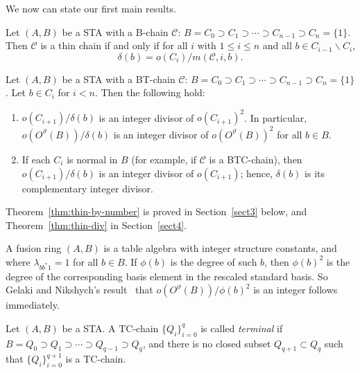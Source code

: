 \documentclass[ALCO,ThmDefs,Unicode,epreuves]{cedram}
\begin{document}
We now can state our first main results.

\begin{thm}
\label{thm:thin-by-number}
Let $(A, B)$ be a STA with a B-chain $\mathcal{C}$: $B = C_0 \supset C_1
\supset \cdots \supset C_{n-1} \supset C_n = \{1\}$. Then $\mathcal{C}$
is a thin chain if and only if for all $i$ with $1 \leq i \leq n$ and
all $b \in C_{i-1}\backslash C_i$,
\[
\delta(b) = o(C_i)/m(\mathcal{C}, i, b).
\]
\end{thm}

\begin{thm}
\label{thm:thin-div}
Let $(A, B)$ be a STA with a BT-chain $\mathcal{C}$: $B = C_0 \supset
C_1 \supset \cdots \supset C_{n-1} \supset C_n = \{1\}$. Let $b \in
C_i$ for $i < n$. Then the following hold:
\begin{enumerate}[label = (\roman*)] 
\item $o(C_{i+1})/\delta(b)$ is an integer divisor of
$o(C_{i+1})^2$. In particular,
$o(O^{\vartheta}(B))/\delta(b)$ is an integer divisor of
$o(O^{\vartheta}(B))^2$ for all $b \in B$. 
\item If each $C_i$ is normal in $B$ (for example, if $\mathcal{C}$ is a
BTC-chain), then $o(C_{i+1})/\delta(b)$ is an integer divisor of
$o(C_{i+1})$; hence, $\delta(b)$ is its complementary integer divisor.
\end{enumerate}
\end{thm} 

Theorem~\ref{thm:thin-by-number} is proved in Section~\ref{sect3}  below, and
Theorem~\ref{thm:thin-div} in Section~\ref{sect4}. 

\begin{rema}
\label{rem:fus}
A fusion ring $(A, B)$ is a table algebra with integer structure
constants, and where $\lambda_{bb^*1} = 1$ for all $b \in B$. If
$\phi(b)$ is the degree of such $b$, then $\phi(b)^2$ is the degree of
the corresponding basis element in the rescaled standard basis. So
Gelaki and Nikshych's result~\cite [Corollary~5.3]{GN} that
$o(O^{\vartheta}(B))/\phi(b)^2$ is an integer follows immediately.
\end{rema}

\begin{defi}
\label{def:terminal}
Let $(A, B)$ be a STA. A TC-chain $\{Q_i\}_{i=0}^q$ is called
\emph{terminal} if $B = Q_0 \supset Q_1 \supset \cdots \supset Q_{q-1}
\supset Q_q$, and there is no closed subset $Q_{q+1} \subset Q_q$ such
that $\{Q_i\}_{i=0}^{q+1}$ is a TC-chain.
\end{defi}
\end{document}
